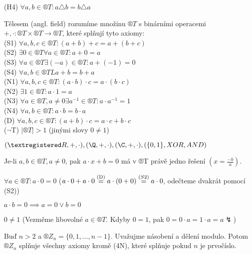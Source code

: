 \documentclass[12pt]{article}					%
\begin{document}
    \begin{poznamka}
        (H4) $\forall a, b \in ®T: a\triangle b = b\triangle a$
    \end{poznamka}

    \begin{definice}[Těleso]
        Tělesem (angl. field) rozumíme množinu $®T$ s binárními operacemi $+, \cdot : ®T\times ®T \rightarrow ®T$, které splňují tyto axiomy:\\
        (S1) $\forall a, b, c \in ®T: (a+b)+c = a+(b+c)$\\
        (S2) $\exists 0\in ®T \forall a \in ®T: a+0 = a$\\
        (S3) $\forall a \in ®T \exists (-a) \in ®T: a+(-1) = 0$\\
        (S4) $\forall a, b \in ®TL a+b = b+a$\\
        (N1) $\forall a, b, c \in ®T: (a\cdot b)\cdot c = a\cdot (b\cdot c)$\\
        (N2) $\exists 1 \in ®T: a\cdot 1 = a$\\
        (N3) $\forall a \in ®T, a≠0 \exists a^{-1}\in®T: a\cdot a^{-1} = 1$\\
        (N4) $\forall a,b \in ®T: a\cdot b = b\cdot a$\\
        (D) $\forall a,b,c \in ®T: (a+b)\cdot c = a\cdot c + b\cdot c$\\
        ($\neg$T) $|®T|>1$ (jinými slovy $0 ≠ 1$)

    \end{definice}
    
    \begin{priklady}
        $(®R, +, \cdot), (\Q, +, \cdot), (\C, +, \cdot), (\{0, 1\}, XOR, AND)$
    \end{priklady}

    \begin{tvrzeni}
        Je-li $a, b \in ®T, a≠0$, pak $a\cdot x+b = 0$ má v ®T právě jedno řešení $(x = \frac{-b}{a})$.

        $\forall a\in ®T: a\cdot 0 = 0$ ($a\cdot 0 + a\cdot 0 \stackrel{\text{(D)}}{=} a\cdot(0+0) \stackrel{\text(S2)}{=} a\cdot 0$, odečteme dvakrát pomocí (S2))

        $a\cdot b = 0 \implies a = 0 \lor b=0$

        $0 ≠ 1$ (Vezměme libovolné $a \in ®T$. Kdyby $0=1$, pak $0 = 0\cdot a = 1\cdot a = a \lightning$)
    \end{tvrzeni}

    \begin{priklady}
        Buď $n>2$ a $®Z_n = \{0,1,…,n-1\}$. Uvažujme násobení a dělení modulo. Potom $®Z_n$ splňuje všechny axiomy kromě (4N), které splňuje pokud $n$ je prvočíslo.
    \end{priklady}
\end{document}
